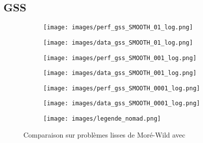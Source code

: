 	\subsection{GSS}
	\begin{figure}[!htb] %
		\centering
		\begin{subfigure}{0.43\textwidth}
			\texttt{[image: images/perf\_gss\_SMOOTH\_01\_log.png]}
		\end{subfigure}%
		\begin{subfigure}{0.43\textwidth}
			\texttt{[image: images/data\_gss\_SMOOTH\_01\_log.png]}
		\end{subfigure}
		\smallskip
		\begin{subfigure}{0.43\textwidth}
			\texttt{[image: images/perf\_gss\_SMOOTH\_001\_log.png]}
		\end{subfigure}%
		\begin{subfigure}{0.43\textwidth}
			\texttt{[image: images/data\_gss\_SMOOTH\_001\_log.png]}
		\end{subfigure}
		\smallskip
		\begin{subfigure}{0.43\textwidth}
			\texttt{[image: images/perf\_gss\_SMOOTH\_0001\_log.png]}
		\end{subfigure}%
		\begin{subfigure}{0.43\textwidth}
			\texttt{[image: images/data\_gss\_SMOOTH\_0001\_log.png]}
		\end{subfigure}
		\smallskip
		\begin{subfigure}{0.95\textwidth}
			\texttt{[image: images/legende\_nomad.png]}
		\end{subfigure}
		\caption{Comparaison sur problèmes lisses de Moré-Wild avec \MADS} \label{fig:1}
	\end{figure}
	\clearpage
